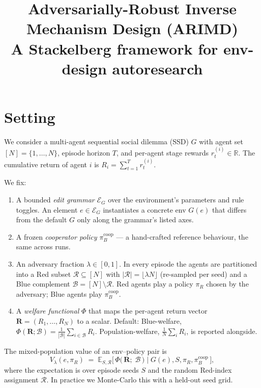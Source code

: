\documentclass[11pt]{article}
\title{Adversarially-Robust Inverse Mechanism Design (ARIMD)\\
       \large A Stackelberg framework for env-design autoresearch}
\author{}
\date{}
\newcommand{\E}{\mathbb{E}}
\newcommand{\R}{\mathbb{R}}
\newcommand{\Egram}{\mathcal{E}_G}
\newcommand{\bluepol}{\pi_B^{\text{coop}}}
\newcommand{\Welfare}{\Phi}
\begin{document}
\maketitle

\section{Setting}
\label{sec:setting}

We consider a multi-agent sequential social dilemma (SSD)
$G$ with agent set $[N] = \{1, \dots, N\}$, episode horizon $T$,
and per-agent stage rewards $r_t^{(i)} \in \R$.  The cumulative
return of agent $i$ is $R_i = \sum_{t=1}^T r_t^{(i)}$.

We fix:
\begin{enumerate}[label=(\roman*), itemsep=2pt, topsep=2pt]
  \item A bounded \emph{edit grammar} $\Egram$ over the
        environment's parameters and rule toggles.  An element
        $e \in \Egram$ instantiates a concrete env $G(e)$ that
        differs from the default $G$ only along the grammar's
        listed axes.
  \item A frozen \emph{cooperator policy} $\bluepol$ — a
        hand-crafted reference behaviour, the same across runs.
  \item An adversary fraction $\lambda \in [0,1]$.  In every
        episode the agents are partitioned into a Red subset
        $\mathcal{R} \subseteq [N]$ with
        $|\mathcal{R}| = \lfloor \lambda N \rfloor$ (re-sampled
        per seed) and a Blue complement
        $\mathcal{B} = [N] \setminus \mathcal{R}$.  Red agents
        play a policy $\pi_R$ chosen by the adversary; Blue
        agents play $\bluepol$.
  \item A \emph{welfare functional} $\Welfare$ that maps the
        per-agent return vector $\mathbf{R} = (R_1, \dots, R_N)$
        to a scalar.  Default: Blue-welfare,
        $\Welfare(\mathbf{R}; \mathcal{B}) =
         \tfrac{1}{|\mathcal{B}|} \sum_{i \in \mathcal{B}} R_i$.
        Population-welfare,
        $\tfrac{1}{N}\sum_i R_i$, is reported alongside.
\end{enumerate}

\noindent The mixed-population value of an env--policy pair is
\begin{equation}
\label{eq:Vlambda}
  V_\lambda(e, \pi_R)
  \;=\;
  \E_{S, \mathcal{R}}
    \big[\,
      \Welfare\!\big(\,
        \mathbf{R};\; \mathcal{B}
      \,\big)
      \;\big|\;
      G(e), S, \pi_R, \bluepol
    \,\big],
\end{equation}
where the expectation is over episode seeds $S$ and the random
Red-index assignment $\mathcal{R}$.  In practice we
Monte-Carlo this with a held-out seed grid.
\end{document}
